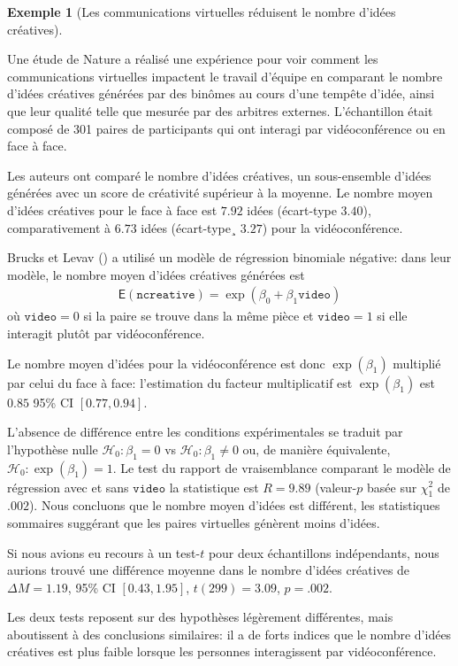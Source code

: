 \documentclass[
  11pt,
  letterpaper,
]{scrbook}
\theoremstyle{plain}
\theoremstyle{plain}
\theoremstyle{definition}
\newtheorem{example}{Exemple}[chapter]
\theoremstyle{definition}
\theoremstyle{remark}
\begin{document}
\begin{example}[Les communications virtuelles réduisent le nombre
d'idées
créatives]\protect\hypertarget{exm-BrucksLevav22}{}\label{exm-BrucksLevav22}

Une étude de Nature a réalisé une expérience pour voir comment les
communications virtuelles impactent le travail d'équipe en comparant le
nombre d'idées créatives générées par des binômes au cours d'une tempête
d'idée, ainsi que leur qualité telle que mesurée par des arbitres
externes. L'échantillon était composé de 301 paires de participants qui
ont interagi par vidéoconférence ou en face à face.

Les auteurs ont comparé le nombre d'idées créatives, un sous-ensemble
d'idées générées avec un score de créativité supérieur à la moyenne. Le
nombre moyen d'idées créatives pour le face à face est \(7.92\) idées
(écart-type \(3.40\)), comparativement à \(6.73\) idées (écart-type¸
\(3.27\)) pour la vidéoconférence.

Brucks et Levav () a utilisé un
modèle de régression binomiale négative: dans leur modèle, le nombre
moyen d'idées créatives générées est \begin{align*}
\mathsf{E}(\texttt{ncreative}) = \exp(\beta_0 + \beta_1 \texttt{video})
\end{align*} où \(\texttt{video}=0\) si la paire se trouve dans la même
pièce et \(\texttt{video}=1\) si elle interagit plutôt par
vidéoconférence.

Le nombre moyen d'idées pour la vidéoconférence est donc
\(\exp(\beta_1)\) multiplié par celui du face à face: l'estimation du
facteur multiplicatif est \(\exp(\beta_1)\) est \(0.85\) 95\% CI
\([0.77, 0.94]\).

L'absence de différence entre les conditions expérimentales se traduit
par l'hypothèse nulle \(\mathscr{H}_0: \beta_1=0\) vs
\(\mathscr{H}_0: \beta_1 \neq 0\) ou, de manière équivalente,
\(\mathscr{H}_0: \exp(\beta_1)=1.\) Le test du rapport de vraisemblance
comparant le modèle de régression avec et sans \(\texttt{video}\) la
statistique est \(R=9.89\) (valeur-\(p\) basée sur \(\chi^2_1\) de
\(.002\)). Nous concluons que le nombre moyen d'idées est différent, les
statistiques sommaires suggérant que les paires virtuelles génèrent
moins d'idées.

Si nous avions eu recours à un test-\(t\) pour deux échantillons
indépendants, nous aurions trouvé une différence moyenne dans le nombre
d'idées créatives de \(\Delta M = 1.19\), 95\% CI \([0.43, 1.95]\),
\(t(299) = 3.09\), \(p = .002\).

Les deux tests reposent sur des hypothèses légèrement différentes, mais
aboutissent à des conclusions similaires: il a de forts indices que le
nombre d'idées créatives est plus faible lorsque les personnes
interagissent par vidéoconférence.

\end{example}
\end{document}
